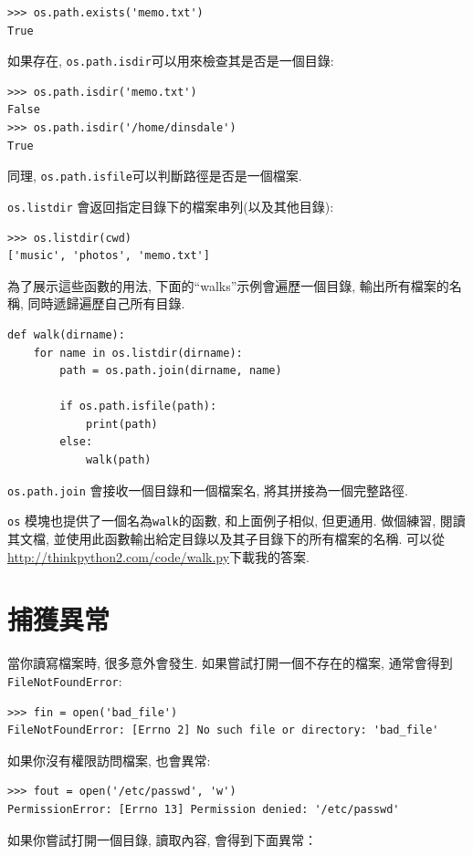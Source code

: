 \documentclass[10pt]{book}
\begin{document}
\begin{verbatim}
>>> os.path.exists('memo.txt')
True
\end{verbatim}
%
如果存在, {\tt os.path.isdir}可以用來檢查其是否是一個目錄:

\begin{verbatim}
>>> os.path.isdir('memo.txt')
False
>>> os.path.isdir('/home/dinsdale')
True
\end{verbatim}
%
同理, {\tt os.path.isfile}可以判斷路徑是否是一個檔案. 

{\tt os.listdir} 會返回指定目錄下的檔案串列(以及其他目錄):

\begin{verbatim}
>>> os.listdir(cwd)
['music', 'photos', 'memo.txt']
\end{verbatim}
%
為了展示這些函數的用法, 下面的``walks''示例會遍歷一個目錄, 
輸出所有檔案的名稱, 同時遞歸遍歷自己所有目錄. 

\begin{verbatim}
def walk(dirname):
    for name in os.listdir(dirname):
        path = os.path.join(dirname, name)

        if os.path.isfile(path):
            print(path)
        else:
            walk(path)
\end{verbatim}
%

{\tt os.path.join} 會接收一個目錄和一個檔案名, 將其拼接為一個完整路徑. 

{\tt os} 模塊也提供了一個名為{\tt walk}的函數, 和上面例子相似, 但更通用. 
做個練習, 閱讀其文檔, 並使用此函數輸出給定目錄以及其子目錄下的所有檔案的名稱. 
可以從\url{http://thinkpython2.com/code/walk.py}下載我的答案. 


\section{捕獲異常}
\label{catch}

當你讀寫檔案時, 很多意外會發生. 
如果嘗試打開一個不存在的檔案, 通常會得到{\tt FileNotFoundError}:

\begin{verbatim}
>>> fin = open('bad_file')
FileNotFoundError: [Errno 2] No such file or directory: 'bad_file'

\end{verbatim}
%
如果你沒有權限訪問檔案, 也會異常:

\begin{verbatim}
>>> fout = open('/etc/passwd', 'w')
PermissionError: [Errno 13] Permission denied: '/etc/passwd'
\end{verbatim}
%
如果你嘗試打開一個目錄, 讀取內容, 會得到下面異常：
\end{document}
